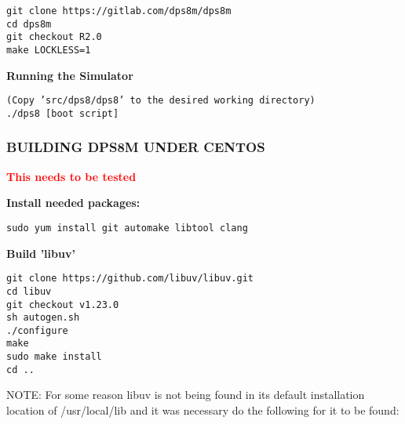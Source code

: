 \begin{adjustwidth}{5ex}{1ex}
    \texttt{git clone https://gitlab.com/dps8m/dps8m} \\
    \texttt{cd dps8m} \\
    \texttt{git checkout R2.0} \\
    \texttt{make LOCKLESS=1} \\
\end{adjustwidth}

\textbf{Running the Simulator}

\begin{adjustwidth}{5ex}{1ex}
    \texttt{(Copy 'src/dps8/dps8' to the desired working directory)} \\
    \texttt{./dps8 [boot script]} \\
\end{adjustwidth}

\newpage

\subsubsection[Building dps8m under CentOS]{BUILDING DPS8M UNDER CENTOS}

\textbf{\textcolor{red}{This needs to be tested}}

\textbf{Install needed packages:}

\begin{adjustwidth}{5ex}{1ex}
	\texttt{sudo yum install git automake libtool clang} \\
\end{adjustwidth}

\textbf{Build 'libuv'}

\begin{adjustwidth}{5ex}{1ex}
    \texttt{git clone https://github.com/libuv/libuv.git} \\
    \texttt{cd libuv} \\
    \texttt{git checkout v1.23.0} \\
    \texttt{sh autogen.sh} \\
    \texttt{./configure} \\
    \texttt{make} \\
    \texttt{sudo make install} \\
    \texttt{cd ..} \\
\end{adjustwidth}

NOTE: For some reason libuv is not being found in its default installation location of /usr/local/lib and it was necessary do the following for it to be found:

